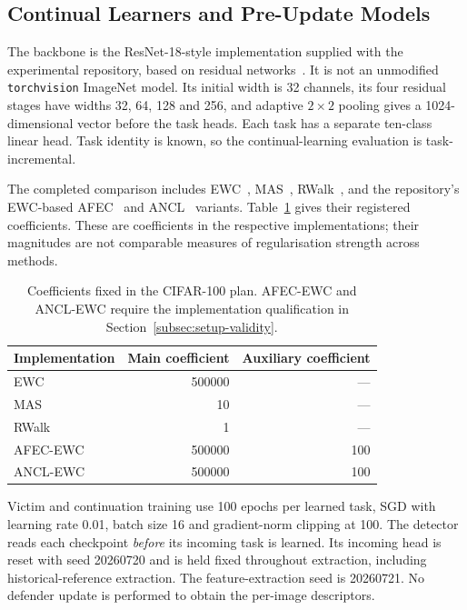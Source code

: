 \subsection{Continual Learners and Pre-Update Models}
\label{subsec:setup-learners}

The backbone is the ResNet-18-style implementation supplied with the
experimental repository, based on residual networks~\cite{he2016deep}.
It is not an unmodified \texttt{torchvision} ImageNet model. Its initial
width is 32 channels, its four residual stages have widths 32, 64, 128 and
256, and adaptive $2\times2$ pooling gives a 1024-dimensional vector before
the task heads. Each task has a separate ten-class linear head. Task
identity is known, so the continual-learning evaluation is
task-incremental.

The completed comparison includes EWC~\cite{kirkpatrick2017ewc},
MAS~\cite{aljundi2018mas}, RWalk~\cite{chaudhry2018rwalk}, and the
repository's EWC-based AFEC~\cite{wang2021afec} and
ANCL~\cite{kim2023ancl} variants. Table~\ref{tab:setup-cl} gives their
registered coefficients. These are coefficients in the respective
implementations; their magnitudes are not comparable measures of
regularisation strength across methods.

\begin{table}[tbp]
\centering
\begin{tabular}{lrr}
\toprule
Implementation & Main coefficient & Auxiliary coefficient\\
\midrule
EWC & 500000 & ---\\
MAS & 10 & ---\\
RWalk & 1 & ---\\
AFEC-EWC & 500000 & 100\\
ANCL-EWC & 500000 & 100\\
\bottomrule
\end{tabular}
\caption{Coefficients fixed in the CIFAR-100 plan. AFEC-EWC and ANCL-EWC
require the implementation qualification in
Section~\ref{subsec:setup-validity}.}
\label{tab:setup-cl}
\end{table}

Victim and continuation training use 100 epochs per learned task, SGD with
learning rate 0.01, batch size 16 and gradient-norm clipping at 100.
The detector reads each checkpoint \emph{before} its incoming task is
learned. Its incoming head is reset with seed 20260720 and is held fixed
throughout extraction, including historical-reference extraction. The
feature-extraction seed is 20260721. No defender update is performed to
obtain the per-image descriptors.

